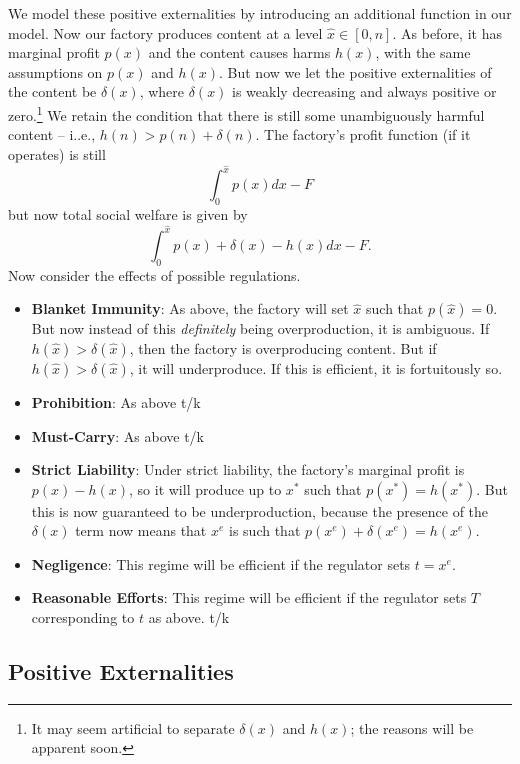 We model these positive externalities by introducing an additional function in our model. Now our factory produces content at a level $\hat{x} \in [0,n]$. As before, it has  marginal profit $p(x)$ and the content causes harms $h(x)$, with the same assumptions on $p(x)$ and $h(x)$. But now we let the positive externalities  of the content be $\delta(x)$, where $\delta(x)$ is weakly decreasing and always positive or zero.\footnote{It may seem artificial to separate $\delta(x)$ and $h(x)$; the reasons will be apparent soon.} We retain the condition that there is still some unambiguously harmful content -- i..e., $h(n) > p(n) + \delta(n)$. The factory's profit function (if it operates) is still 
\begin{equation}
\int_{0}^{\hat{x}} p(x) dx - F
\end{equation}
but now total social welfare is given by
\begin{equation}
\int_{0}^{\hat{x}} p(x) + \delta(x) - h(x) dx - F.
\end{equation}
Now consider the effects of possible regulations.
\begin{itemize}
    \item \textbf{Blanket Immunity}: As above, the factory will set $\hat{x}$ such that $p(\hat{x}) = 0$. But now instead of this \emph{definitely} being overproduction, it is ambiguous. If $h(\hat{x}) > \delta(\hat{x})$, then the factory is overproducing content. But if  $h(\hat{x}) > \delta(\hat{x})$, it will underproduce. If this is efficient, it is fortuitously so.
    \item \textbf{Prohibition}: As above t/k
    \item \textbf{Must-Carry}: As above t/k
    \item \textbf{Strict Liability}: Under strict liability, the factory's marginal profit is $p(x) - h(x)$, so it will produce up to $x^*$ such that $p(x^*) = h(x^*)$. But this is now guaranteed to be underproduction, because the presence of the $\delta(x)$ term now means that $x^e$ is such that $p(x^e) + \delta(x^e) = h(x^e)$.
     \item \textbf{Negligence}: This regime will be efficient if the regulator sets $t = x^e$.
     \item \textbf{Reasonable Efforts}: This regime will be efficient if the regulator sets $T$ corresponding to $t$ as above. t/k
\end{itemize}

\subsection{Positive Externalities}

